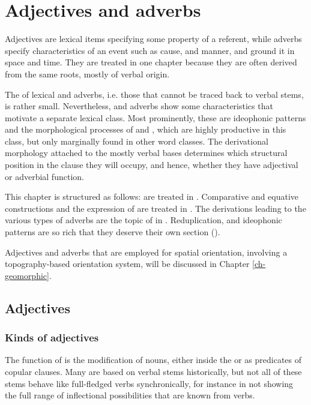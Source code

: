 ﻿
\chapter{Adjectives and adverbs} \label{adj-adv}

Adjectives are lexical items specifying some property of a referent, while adverbs specify characteristics of an event such as cause,  and manner, and ground it in space and time. They are treated in one chapter because they are often derived from the same roots, mostly of verbal origin.  

The  of lexical  and adverbs, i.e. those that cannot be traced back to verbal stems, is rather small. Nevertheless,  and adverbs show some characteristics that motivate a separate lexical class. Most prominently, these are ideophonic patterns and the morphological processes of  and , which are highly  productive in this class, but only marginally found in other word classes. The derivational morphology attached to the mostly verbal bases determines which structural position in the clause they will occupy, and hence, whether they have adjectival or adverbial function. 

This chapter is structured as follows:   are treated in . Comparative and equative constructions and the expression of  are treated in .  The  derivations leading to the various types of adverbs are the topic of in . Reduplication,  and ideophonic patterns are so rich that they deserve their own section (). 

Adjectives and adverbs that are employed for  spatial orientation, involving a topography-based  orientation system, will be discussed in Chapter \ref{ch-geomorphic}. 

\section{Adjectives}\label{adj}

\subsection{Kinds of adjectives}\label{adj-kinds}

The function of  is the modification of nouns, either inside the  or as predicates of copular clauses. Many  are based on verbal stems historically, but not all of these stems behave like full-fledged verbs synchronically, for  instance in not showing the full range of inflectional possibilities that are known from verbs. 

